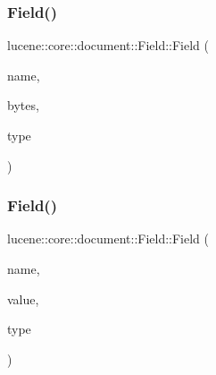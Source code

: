 \subsubsection{\texorpdfstring{Field()}{Field()}\hspace{0.1cm}{\footnotesize\ttfamily [7/11]}}
{\footnotesize\ttfamily lucene\+::core\+::document\+::\+Field\+::\+Field (\begin{DoxyParamCaption}\item[{const std\+::string \&}]{name,  }\item[{\mbox{\hyperlink{classlucene_1_1core_1_1util_1_1BytesRef}{lucene\+::core\+::util\+::\+Bytes\+Ref}} \&\&}]{bytes,  }\item[{const \mbox{\hyperlink{classlucene_1_1core_1_1document_1_1FieldType}{Field\+Type}} \&}]{type }\end{DoxyParamCaption})\hspace{0.3cm}{\ttfamily [inline]}}

\mbox{\label{classlucene_1_1core_1_1document_1_1Field_af5870317c74d273ed0afd4715904a9e5}} 
\subsubsection{\texorpdfstring{Field()}{Field()}\hspace{0.1cm}{\footnotesize\ttfamily [8/11]}}
{\footnotesize\ttfamily lucene\+::core\+::document\+::\+Field\+::\+Field (\begin{DoxyParamCaption}\item[{const std\+::string \&}]{name,  }\item[{const std\+::string \&}]{value,  }\item[{const \mbox{\hyperlink{classlucene_1_1core_1_1document_1_1FieldType}{Field\+Type}} \&}]{type }\end{DoxyParamCaption})\hspace{0.3cm}{\ttfamily [inline]}}

\mbox{\label{classlucene_1_1core_1_1document_1_1Field_aaa472d50639e11ca10e5e06fe07fb87c}} 
